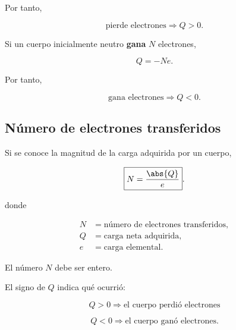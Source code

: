 Por tanto,

\begin{equation}
    \boxed{
    \text{pierde electrones}
    \Longrightarrow
    Q>0
    }.
\end{equation}

Si un cuerpo inicialmente neutro \textbf{gana} \(N\) electrones,

\begin{equation}
    \boxed{
    Q=-Ne
    }.
\end{equation}

Por tanto,

\begin{equation}
    \boxed{
    \text{gana electrones}
    \Longrightarrow
    Q<0
    }.
\end{equation}



\subsection{Número de electrones transferidos}

Si se conoce la magnitud de la carga adquirida por un cuerpo,

\begin{equation}
    \boxed{
    N=\frac{\abs{Q}}{e}
    }.
\end{equation}

donde

\begin{align*}
    N &= \text{número de electrones transferidos},\\
    Q &= \text{carga neta adquirida},\\
    e &= \text{carga elemental}.
\end{align*}

El número \(N\) debe ser entero.

El signo de \(Q\) indica qué ocurrió:

\begin{equation}
    \boxed{
    Q>0
    \Longrightarrow
    \text{el cuerpo perdió electrones}
    }
\end{equation}

\begin{equation}
    \boxed{
    Q<0
    \Longrightarrow
    \text{el cuerpo ganó electrones}
    }.
\end{equation}


